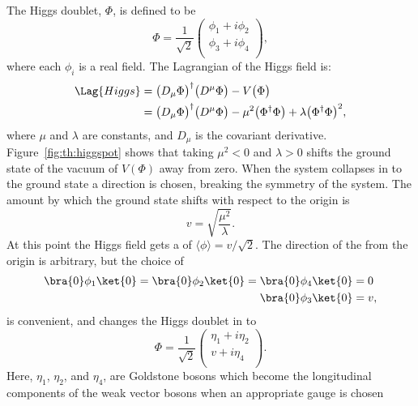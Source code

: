 The Higgs doublet, $\Phi$, is defined to be
\begin{equation}
  \Phi = \frac{1}{\sqrt{2}}
  \begin{pmatrix}
    \phi_1 + i\phi_2 \\
    \phi_3 + i\phi_4 \\
  \end{pmatrix},
  \label{eq:th:phi}
\end{equation}
where each $\phi_i$ is a real field.
The Lagrangian of the Higgs field is:
\begin{align}
  \Lag{Higgs}
  &= \big(D_\mu\Phi\big)^\dagger\big(D^\mu\Phi\big) - V\big(\Phi\big) \nonumber\\
  &= \big(D_\mu\Phi\big)^\dagger\big(D^\mu\Phi\big) - \mu^2\big(\Phi^\dagger\Phi\big) +
  \lambda\big(\Phi^\dagger\Phi\big)^{2},
  \label{eq:th:laghiggs1}
\end{align}
where $\mu$ and $\lambda$ are constants, and $D_\mu$ is the covariant derivative.
Figure~\ref{fig:th:higgspot} shows that
taking $\mu^2<0$ and $\lambda>0$ shifts the ground state of the vacuum of $V(\Phi)$ away from zero.
When the system collapses in to the ground state a direction is chosen, breaking the symmetry of
the system.
The amount by which the ground state shifts with respect to the origin is
\begin{equation}
  v = \sqrt{\frac{\mu^2}{\lambda}}.
\end{equation}
At this point the Higgs field gets a \VEV of $\langle\phi\rangle = v/\sqrt{2}$.
The direction of the \VEV from the origin is arbitrary, but the choice of
\begin{align}
  \bra{0}\phi_1\ket{0} =
  \bra{0}\phi_2\ket{0} =
  \bra{0}\phi_4\ket{0} &= 0 \nonumber\\
  \bra{0}\phi_3\ket{0} &= v,
\end{align}
is convenient, and changes the Higgs doublet in  to
\begin{equation}
  \Phi = \frac{1}{\sqrt{2}}
  \begin{pmatrix}
    \eta_1 + i\eta_2 \\
    v + i\eta_4 \\
  \end{pmatrix}.
  \label{eq:th:eta}
\end{equation}
Here, $\eta_1$, $\eta_2$, and $\eta_4$, are Goldstone bosons which
become the longitudinal components of the weak vector bosons when an appropriate gauge is chosen
